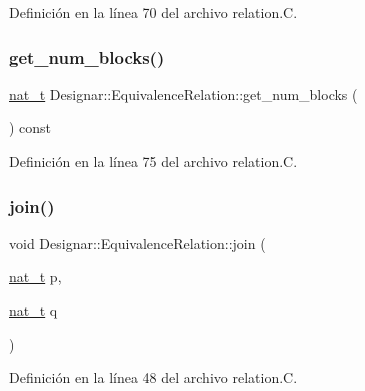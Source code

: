 Definición en la línea 70 del archivo relation.\+C.

\mbox{\label{class_designar_1_1_equivalence_relation_a1de9de1745175828d1b3f0184df76920}} 
\subsubsection{\texorpdfstring{get\+\_\+num\+\_\+blocks()}{get\_num\_blocks()}}
{\footnotesize\ttfamily \hyperlink{namespace_designar_aa72662848b9f4815e7bf31a7cf3e33d1}{nat\+\_\+t} Designar\+::\+Equivalence\+Relation\+::get\+\_\+num\+\_\+blocks (\begin{DoxyParamCaption}{ }\end{DoxyParamCaption}) const}



Definición en la línea 75 del archivo relation.\+C.

\mbox{\label{class_designar_1_1_equivalence_relation_a06f07c2d9d53919339afcdd369daa277}} 
\subsubsection{\texorpdfstring{join()}{join()}}
{\footnotesize\ttfamily void Designar\+::\+Equivalence\+Relation\+::join (\begin{DoxyParamCaption}\item[{\hyperlink{namespace_designar_aa72662848b9f4815e7bf31a7cf3e33d1}{nat\+\_\+t}}]{p,  }\item[{\hyperlink{namespace_designar_aa72662848b9f4815e7bf31a7cf3e33d1}{nat\+\_\+t}}]{q }\end{DoxyParamCaption})}



Definición en la línea 48 del archivo relation.\+C.

\mbox{\label{class_designar_1_1_equivalence_relation_abd7ed9854a58f13f215507e50c0eecd3}} 
